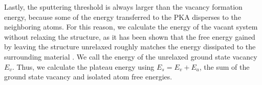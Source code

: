 \documentclass{article}
\begin{document}
Lastly, the sputtering threshold is always larger than the vacancy formation
energy, because some of the energy transferred to the PKA disperses to the
neighboring atoms.
For this reason, we calculate the energy of the vacant system without relaxing
the structure, as it has been shown that the free energy gained by leaving the
structure unrelaxed roughly matches the energy dissipated to the
surrounding material \cite{Komsa2012}.
We call the energy of the unrelaxed ground state vacancy $E_v$.
Thus, we calculate the plateau energy using $E_s = E_v + E_a$, the sum of the
ground state vacancy and isolated atom free energies.
\end{document}
